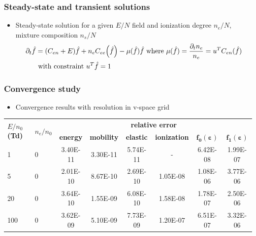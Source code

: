 \documentclass[mathserif, aspectratio=169]{beamer}
\newcommand{\of}[1]{\mleft( #1 \mright)}
\begin{document}
\begin{frame}
	\frametitle{Steady-state and transient solutions}
	\begin{itemize}
		\item Steady-state solution for a given $E/N$ field and ionization degree $n_e/N$, mixture composition $n_s/N$
		\begin{align}
			\partial_t {\hat{f}} &=(C_{en}+E)\hat{f} +n_e C_{ee}\of{\hat{f}} - \mu(\hat{f}) \hat{f} \text{ where } \mu(\hat{f}) = \frac{\partial_t n_e}{n_e} = u^T C_{en}(\hat{f})\\
			&\text{ with constraint } u^T \hat{f} = 1 \nonumber 
		\end{align}
	\end{itemize}
\end{frame}

\begin{frame}
	\frametitle{Convergence study}
	\begin{itemize}
		\item Convergence results with resolution in v-space grid
	\end{itemize}
	\begin{table}[!tbhp]
		\centering
		\renewcommand{\arraystretch}{1.2}
		\begin{tabular}{|p{1cm}|p{1cm}|c|c|c|c|c|c|}
		  \hline
		  \multirow{2}{1cm}{\textbf{$E/n_0$ (Td)}} & \multirow{2}{1cm}{\boldmath$n_e/n_0$} & \multicolumn{6}{c|}{\textbf{relative error}}  \\
		  \cline{3-8}
		  & & \textbf{energy} &\textbf{mobility} & \textbf{elastic} & \textbf{ionization} & {$\mathbf{f_0(\varepsilon)}$} & {$\mathbf{f_1(\varepsilon)}$}\\
		  \hline
		  1	  &  0 & 	3.40E-11 & 	3.30E-11	&  5.74E-11	&   -	     &   6.42E-08	&1.99E-07\\
		  5	  &  0 & 	2.01E-10 & 	8.67E-10	&  2.69E-10	& 1.05E-08 &   1.08E-06	&3.77E-06\\
		  20	&  0 &  3.64E-10 & 	1.55E-09	&  6.08E-10	& 1.58E-08 &   1.78E-07	&2.50E-06\\
		  100 &  0 & 	3.62E-09 & 	5.10E-09	&  7.73E-09	& 1.20E-07 &   6.51E-07	&3.32E-06\\
		  \hline                  

\end{tabular}
\end{table}
\end{frame}
\end{document}
